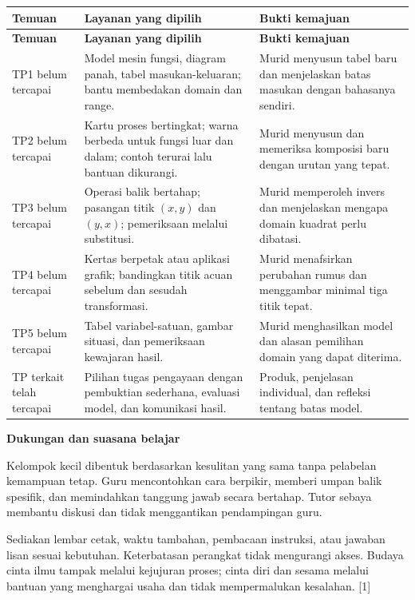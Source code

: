 \documentclass[11pt,a4paper]{article}
\begin{document}
{\small\setlength{\tabcolsep}{2mm}\renewcommand{\arraystretch}{1.35}\begin{longtable}{|>{\raggedright\arraybackslash}p{33.597mm}|>{\raggedright\arraybackslash}p{67.194mm}|>{\raggedright\arraybackslash}p{64.609mm}|}\hline
\rowcolor{gray!10}\textbf{Temuan} & \textbf{Layanan yang dipilih} & \textbf{Bukti kemajuan}\\ \hline
\endfirsthead
\rowcolor{gray!10}\textbf{Temuan} & \textbf{Layanan yang dipilih} & \textbf{Bukti kemajuan}\\ \hline
\endhead
TP1 belum tercapai & Model mesin fungsi, diagram panah, tabel masukan-keluaran; bantu membedakan domain dan range. & Murid menyusun tabel baru dan menjelaskan batas masukan dengan bahasanya sendiri.\\ \hline
TP2 belum tercapai & Kartu proses bertingkat; warna berbeda untuk fungsi luar dan dalam; contoh terurai lalu bantuan dikurangi. & Murid menyusun dan memeriksa komposisi baru dengan urutan yang tepat.\\ \hline
TP3 belum tercapai & Operasi balik bertahap; pasangan titik \((x,y)\) dan \((y,x)\); pemeriksaan melalui substitusi. & Murid memperoleh invers dan menjelaskan mengapa domain kuadrat perlu dibatasi.\\ \hline
TP4 belum tercapai & Kertas berpetak atau aplikasi grafik; bandingkan titik acuan sebelum dan sesudah transformasi. & Murid menafsirkan perubahan rumus dan menggambar minimal tiga titik tepat.\\ \hline
TP5 belum tercapai & Tabel variabel-satuan, gambar situasi, dan pemeriksaan kewajaran hasil. & Murid menghasilkan model dan alasan pemilihan domain yang dapat diterima.\\ \hline
TP terkait telah tercapai & Pilihan tugas pengayaan dengan pembuktian sederhana, evaluasi model, dan komunikasi hasil. & Produk, penjelasan individual, dan refleksi tentang batas model.\\ \hline
\end{longtable}}\medskip
\par\medskip\noindent\textbf{Dukungan dan suasana belajar}\par\smallskip
Kelompok kecil dibentuk berdasarkan kesulitan yang sama tanpa pelabelan kemampuan tetap. Guru mencontohkan cara berpikir, memberi umpan balik spesifik, dan memindahkan tanggung jawab secara bertahap. Tutor sebaya membantu diskusi dan tidak menggantikan pendampingan guru.\par\medskip
Sediakan lembar cetak, waktu tambahan, pembacaan instruksi, atau jawaban lisan sesuai kebutuhan. Keterbatasan perangkat tidak mengurangi akses. Budaya cinta ilmu tampak melalui kejujuran proses; cinta diri dan sesama melalui bantuan yang menghargai usaha dan tidak mempermalukan kesalahan. [1]\par\medskip
\end{document}
